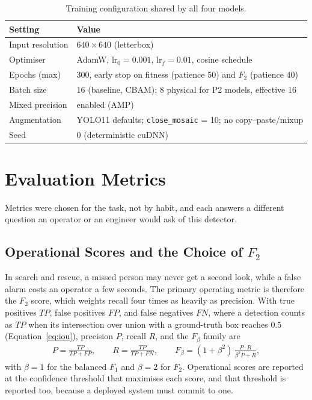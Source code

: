 \begin{table}[tbp]
  \centering
  \caption{Training configuration shared by all four models.}
  \label{tab:setup}
  \begin{tabular}{@{}l l@{}}
    \toprule
    Setting & Value \\
    \midrule
    Input resolution & $640 \times 640$ (letterbox) \\
    Optimiser & AdamW, $\text{lr}_0 = 0.001$, $\text{lr}_f = 0.01$, cosine schedule \\
    Epochs (max) & 300, early stop on fitness (patience 50) and $F_2$ (patience 40) \\
    Batch size & 16 (baseline, CBAM); 8 physical for P2 models, effective 16 \\
    Mixed precision & enabled (AMP) \\
    Augmentation & YOLO11 defaults; \texttt{close\_mosaic} = 10; no copy--paste/mixup \\
    Seed & 0 (deterministic cuDNN) \\
    \bottomrule
  \end{tabular}
\end{table}

\section{Evaluation Metrics}
\label{sec:metrics}
Metrics were chosen for the task, not by habit, and each answers a different
question an operator or an engineer would ask of this detector.

\subsection{Operational Scores and the Choice of $F_2$}
In search and rescue, a missed person may never get a second look, while a
false alarm costs an operator a few seconds. The primary operating metric is
therefore the $F_2$ score, which weights recall four times as heavily as
precision. With true positives $\mathit{TP}$, false positives $\mathit{FP}$,
and false negatives $\mathit{FN}$, where a detection counts as $\mathit{TP}$
when its intersection over union with a ground-truth box reaches $0.5$
(Equation~\ref{eq:iou}), precision $P$, recall $R$, and the $F_\beta$ family
are
\begin{align}
  P = \frac{\mathit{TP}}{\mathit{TP}+\mathit{FP}}, \qquad
  R = \frac{\mathit{TP}}{\mathit{TP}+\mathit{FN}}, \qquad
  F_\beta = (1+\beta^{2})\,\frac{P \cdot R}{\beta^{2} P + R},
\end{align}
with $\beta = 1$ for the balanced $F_1$ and $\beta = 2$ for $F_2$. Operational
scores are reported at the confidence threshold that maximises each score, and
that threshold is reported too, because a deployed system must commit to one.

